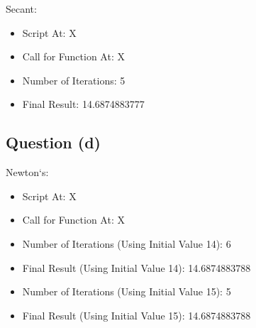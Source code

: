 		Secant:

		\begin{itemize} 
		 	\item{Script At: X}
		 	\item{Call for Function At: X}
		 	\item{Number of Iterations: 5}
		 	\item{Final Result: 14.6874883777}
		\end{itemize}

	\subsection{Question (d)}
		
		Newton`s:

		\begin{itemize} 
		 	\item{Script At: X}
		 	\item{Call for Function At: X}
		 	\item{Number of Iterations (Using Initial Value 14): 6}
			\item{Final Result (Using Initial Value 14): 14.6874883788}
			\item{Number of Iterations (Using Initial Value 15): 5}
		 	\item{Final Result (Using Initial Value 15): 14.6874883788}
		\end{itemize}
